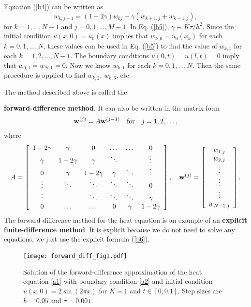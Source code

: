 {Equation (\ref{b4}) can be written as
\begin{equation}
w_{k,j+1}=\left(1-2\gamma\right)w_{kj}+
\gamma\left(
w_{k+1, j}+w_{k-1,j}\right), \label{b5}
\end{equation}
for $k=1,\dots,N-1$ and
$j=0,1,\dots, M-1$. In Eq. (\ref{b5}),
$\gamma\equiv K\tau/h^{2}$. Since the initial condition $u(x,0)=u_{0}(x)$
implies that $w_{k,0}=u_{0}(x_{k})$ for each $k=0, 1, \dots, N$, these values can be used in
Eq. (\ref{b5}) to find the value of $w_{k,1}$ for each $k=1, 2, \dots, N-1$. The boundary conditions
$u(0,t)=u(l,t)=0$ imply that $w_{0,1}=w_{N,1}=0$. Now we know $w_{k,1}$ for each $k=0,1,\dots, N$.
Then the same procedure is applied to find $w_{k,2}$, $w_{k,3}$, etc.


 
 
The method described above is called the {{\bf forward-difference method}.
It can also be written in the matrix form
\begin{equation}
{\bf w}^{(j)}=A{\bf w}^{(j-1)} \quad \hbox{for} \quad j=1,2,\dots, \label{b6}
\end{equation}
where
\begin{equation}
A=\left[
\begin{array}{cccccc}
1-2\gamma &\gamma &0      &\dots  &\dots &0 \\
\gamma &1-2\gamma &\gamma &\ddots  &     &\vdots \\
0      &\gamma &1-2\gamma &\gamma &\ddots &\vdots \\
\vdots &\ddots &\ddots &\ddots &\ddots &0 \\
\vdots &       &\ddots &\ddots &\ddots &\gamma \\
0      &\dots  &\dots  &0      &\gamma &1-2\gamma
\end{array}\right], \quad
{\bf w}^{(j)}=\left[
\begin{array}{c}
w_{1,j} \\
w_{2,j} \\
\vdots \\
\vdots \\
\vdots \\
w_{N-1,j}
\end{array}\right].
\label{b7}
\end{equation}
The forward-difference method for the heat equation is an example of an {\bf explicit finite-difference method}.
It is explicit because we do not need to solve any equations, we just use the explicit formula (\ref{b6}).
\begin{figure}[h]
\centering
\texttt{[image: forward\_diff\_fig1.pdf]}
\caption{Solution of the forward-difference approximation of the heat equation 
\eqref{a1} with boundary condition \eqref{a2} and initial condition $u(x,0)=2\sin(2\pi x)$ for
$K=1$ and $t\in[0,0.1]$. Step sizes are $h=0.05$ and $\tau=0.001$.}
\label{fig2}
\end{figure}

}}

